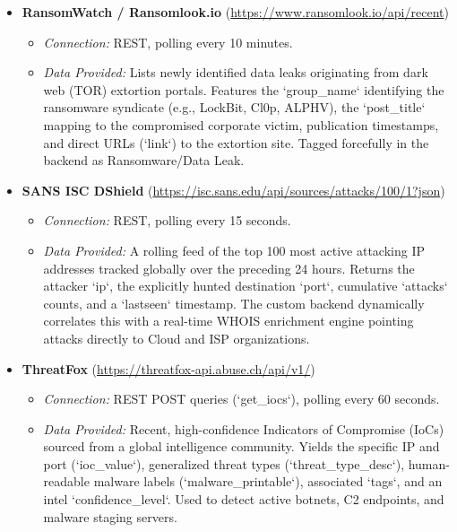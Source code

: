 \documentclass[12pt,a4paper]{article}
\begin{document}
\begin{itemize}[leftmargin=*]
    \item \textbf{RansomWatch / Ransomlook.io} (\url{https://www.ransomlook.io/api/recent})
    \begin{itemize}[noitemsep]
        \item \textit{Connection:} REST, polling every 10 minutes.
        \item \textit{Data Provided:} Lists newly identified data leaks originating from dark web (TOR) extortion portals. Features the `group_name` identifying the ransomware syndicate (e.g., LockBit, Cl0p, ALPHV), the `post_title` mapping to the compromised corporate victim, publication timestamps, and direct URLs (`link`) to the extortion site. Tagged forcefully in the backend as Ransomware/Data Leak.
    \end{itemize}
    \vspace{0.3cm}

    \item \textbf{SANS ISC DShield} (\url{https://isc.sans.edu/api/sources/attacks/100/1?json})
    \begin{itemize}[noitemsep]
        \item \textit{Connection:} REST, polling every 15 seconds.
        \item \textit{Data Provided:} A rolling feed of the top 100 most active attacking IP addresses tracked globally over the preceding 24 hours. Returns the attacker `ip`, the explicitly hunted destination `port`, cumulative `attacks` counts, and a `lastseen` timestamp. The custom backend dynamically correlates this with a real-time WHOIS enrichment engine pointing attacks directly to Cloud and ISP organizations.
    \end{itemize}
    \vspace{0.3cm}

    \item \textbf{ThreatFox} (\url{https://threatfox-api.abuse.ch/api/v1/})
    \begin{itemize}[noitemsep]
        \item \textit{Connection:} REST POST queries (`get_iocs`), polling every 60 seconds.
        \item \textit{Data Provided:} Recent, high-confidence Indicators of Compromise (IoCs) sourced from a global intelligence community. Yields the specific IP and port (`ioc_value`), generalized threat types (`threat_type_desc`), human-readable malware labels (`malware_printable`), associated `tags`, and an intel `confidence_level`. Used to detect active botnets, C2 endpoints, and malware staging servers.
    \end{itemize}
    \vspace{0.3cm}


\end{itemize}
\end{document}

